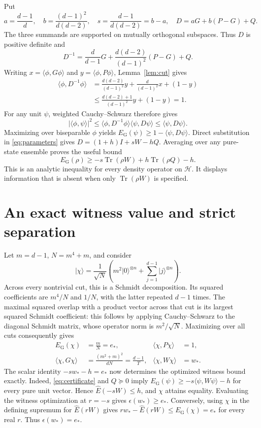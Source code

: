 \documentclass[11pt]{article}
\newcommand{\tr}{\operatorname{Tr}}
\newcommand{\ket}[1]{\lvert #1\rangle}
\newcommand{\EG}{E_{\mathrm G}}
\begin{document}
Put
\begin{equation}\label{eq:parameters}
 a=\frac{d-1}{d},\quad b=\frac{(d-1)^2}{d(d-2)},\quad
 s=\frac{d-1}{d(d-2)}=b-a,\quad
 D=aG+b(P-G)+Q.
\end{equation}
The three summands are supported on mutually orthogonal subspaces.
Thus $D$ is positive definite and
\[
 D^{-1}=\frac d{d-1}G+\frac{d(d-2)}{(d-1)^2}(P-G)+Q.
\]
Writing $x=\langle\phi,G\phi\rangle$ and
$y=\langle\phi,P\phi\rangle$, Lemma~\ref{lem:cut} gives
\begin{align*}
 \langle\phi,D^{-1}\phi\rangle
 &=\frac{d(d-2)}{(d-1)^2}y+\frac d{(d-1)^2}x+(1-y)\\
 &\leq\frac{d(d-2)+1}{(d-1)^2}y+(1-y)=1.
\end{align*}
For any unit $\psi$, weighted Cauchy--Schwarz therefore gives
\[
 |\langle\phi,\psi\rangle|^2
 \leq\langle\phi,D^{-1}\phi\rangle\langle\psi,D\psi\rangle
 \leq\langle\psi,D\psi\rangle.
\]
Maximizing over biseparable $\phi$ yields
$\EG(\psi)\geq1-\langle\psi,D\psi\rangle$. Direct substitution in
\eqref{eq:parameters} gives $D=(1+h)I+sW-hQ$. Averaging over any
pure-state ensemble proves the useful bound
\begin{equation}\label{eq:certificate}
 \boxed{\ \EG(\rho)\geq-s\tr(\rho W)+h\tr(\rho Q)-h.\ }
\end{equation}
This is an analytic inequality for every density operator on $\mathcal H$.
It displays information that is absent when only $\tr(\rho W)$ is specified.

\section{An exact witness value and strict separation}
Let $m=d-1$, $N=m^4+m$, and consider
\[
 \ket\chi=\frac1{\sqrt N}\left(m^2\ket0^{\otimes n}
                          +\sum_{j=1}^{d-1}\ket j^{\otimes n}\right).
\]
Across every nontrivial cut, this is a Schmidt decomposition.
Its squared coefficients are $m^4/N$ and $1/N$, with the latter repeated
$d-1$ times. The maximal squared overlap
with a product vector across that cut is its largest squared Schmidt
coefficient: this follows by applying Cauchy--Schwarz to the diagonal
Schmidt matrix, whose operator norm is $m^2/\sqrt N$.
Maximizing over all cuts consequently gives
\begin{align*}
 \EG(\chi)&=\frac mN=e_*, & \langle\chi,P\chi\rangle&=1,\\
 \langle\chi,G\chi\rangle&=\frac{(m^2+m)^2}{dN}=\frac{d-1}{T}, &
 \langle\chi,W\chi\rangle&=w_*.
\end{align*}
The scalar identity $-s w_*-h=e_*$ now determines the optimized witness
bound exactly. Indeed, \eqref{eq:certificate} and $Q\succeq0$ imply
$\EG(\psi)\geq-s\langle\psi,W\psi\rangle-h$ for every pure unit vector.
Hence $\widehat E(-sW)\leq h$, and $\chi$ attains equality. Evaluating
the witness optimization at $r=-s$ gives $\epsilon(w_*)\geq e_*$.
Conversely, using $\chi$ in the defining supremum for $\widehat E(rW)$
gives $rw_*-\widehat E(rW)\leq\EG(\chi)=e_*$ for every real $r$.
Thus $\epsilon(w_*)=e_*$.
\end{document}
